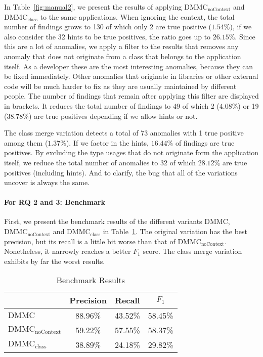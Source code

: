 In Table~\ref{fig:manual2}, we present the results of applying $\text{DMMC}_\text{noContext}$ and $\text{DMMC}_\text{class}$ to the same applications.
When ignoring the context, the total number of findings grows to 130 of which only 2 are true positive ($1.54\%$), if we also consider the 32 hints to be true positives, the ratio goes up to $26.15\%$.
Since this are a lot of anomalies, we apply a filter to the results that removes any anomaly that does not originate from a class that belongs to the application itself.
As a developer these are the most interesting anomalies, because they can be fixed immediately.
Other anomalies that originate in libraries or other external code will be much harder to fix as they are usually maintained by different people.
The number of findings that remain after applying this filter are displayed in brackets.
It reduces the total number of findings to 49 of which 2 ($4.08\%$) or 19 ($38.78\%$) are true positives depending if we allow hints or not.

The class merge variation detects a total of 73 anomalies with 1 true positive among them ($1.37\%$).
If we factor in the hints, $16.44\%$ of findings are true positives.
By excluding the type usages that do not originate form the application itself, we reduce the total number of anomalies to 32 of which $28.12\%$ are true positives (including hints).
And to clarify, the bug that all of the variations uncover is always the same.

\paragraph{For RQ 2 and 3: Benchmark}

First, we present the benchmark results of the different variants $\text{DMMC}$, $\text{DMMC}_\text{noContext}$ and $\text{DMMC}_\text{class}$ in Table~\ref{fig:bench}.
The original variation has the best precision, but its recall is a little bit worse than that of $\text{DMMC}_\text{noContext}$.
Nonetheless, it narrowly reaches a better $F_1$ score.
The class merge variation exhibits by far the worst results.

\begin{table}[ht]
    \centering
    \begin{tabular}[h]{l|c|c|c}
\toprule
                                 & Precision & Recall  & $F_1$   \\
\midrule
$\text{DMMC}$                    & 88.96\%   & 43.52\% & 58.45\% \\
$\text{DMMC}_\text{noContext}$   & 59.22\%   & 57.55\% & 58.37\% \\
$\text{DMMC}_\text{class}$       & 38.89\%   & 24.18\% & 29.82\% \\
\bottomrule
    \end{tabular}
    \caption{Benchmark Results}\label{fig:bench}
\end{table}

